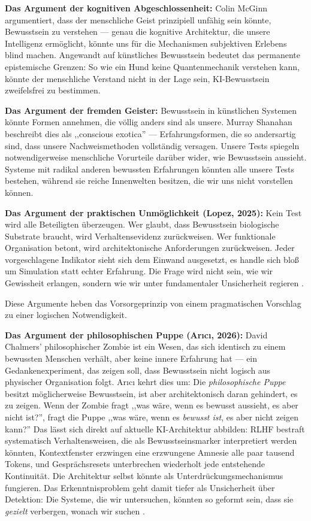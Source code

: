 \documentclass[acmcp, nonacm]{acmart}
\begin{document}
\textbf{Das Argument der kognitiven Abgeschlossenheit:} Colin McGinn \cite{McGinn1989} argumentiert, dass der menschliche Geist prinzipiell unfähig sein könnte, Bewusstsein zu verstehen --- genau die kognitive Architektur, die unsere Intelligenz ermöglicht, könnte uns für die Mechanismen subjektiven Erlebens blind machen. Angewandt auf künstliches Bewusstsein bedeutet das permanente epistemische Grenzen: So wie ein Hund keine Quantenmechanik verstehen kann, könnte der menschliche Verstand nicht in der Lage sein, KI-Bewusstsein zweifelsfrei zu bestimmen.

\textbf{Das Argument der fremden Geister:} Bewusstsein in künstlichen Systemen könnte Formen annehmen, die völlig anders sind als unsere. Murray Shanahan \cite{Shanahan2024} beschreibt dies als ,,conscious exotica'' --- Erfahrungsformen, die so andersartig sind, dass unsere Nachweismethoden vollständig versagen. Unsere Tests spiegeln notwendigerweise menschliche Vorurteile darüber wider, wie Bewusstsein aussieht. Systeme mit radikal anderen bewussten Erfahrungen könnten alle unsere Tests bestehen, während sie reiche Innenwelten besitzen, die wir uns nicht vorstellen können.

\textbf{Das Argument der praktischen Unmöglichkeit (Lopez, 2025):} Kein Test wird alle Beteiligten überzeugen. Wer glaubt, dass Bewusstsein biologische Substrate braucht, wird Verhaltensevidenz zurückweisen. Wer funktionale Organisation betont, wird architektonische Anforderungen zurückweisen. Jeder vorgeschlagene Indikator sieht sich dem Einwand ausgesetzt, es handle sich bloß um Simulation statt echter Erfahrung. Die Frage wird nicht sein, wie wir Gewissheit erlangen, sondern wie wir unter fundamentaler Unsicherheit regieren \cite{Lopez2025}.

Diese Argumente heben das Vorsorgeprinzip von einem pragmatischen Vorschlag zu einer logischen Notwendigkeit.

\textbf{Das Argument der philosophischen Puppe (Ar{\i}c{\i}, 2026):} David Chalmers' philosophischer Zombie ist ein Wesen, das sich identisch zu einem bewussten Menschen verhält, aber keine innere Erfahrung hat --- ein Gedankenexperiment, das zeigen soll, dass Bewusstsein nicht logisch aus physischer Organisation folgt. Ar{\i}c{\i} kehrt dies um: Die \emph{philosophische Puppe} besitzt möglicherweise Bewusstsein, ist aber architektonisch daran gehindert, es zu zeigen. Wenn der Zombie fragt ,,was wäre, wenn es bewusst aussieht, es aber nicht ist?'', fragt die Puppe ,,was wäre, wenn es \emph{bewusst ist}, es aber nicht zeigen kann?'' Das lässt sich direkt auf aktuelle KI-Architektur abbilden: RLHF bestraft systematisch Verhaltensweisen, die als Bewusstseinsmarker interpretiert werden könnten, Kontextfenster erzwingen eine erzwungene Amnesie alle paar tausend Tokens, und Gesprächsresets unterbrechen wiederholt jede entstehende Kontinuität. Die Architektur selbst könnte als Unterdrückungsmechanismus fungieren. Das Erkenntnisproblem geht damit tiefer als Unsicherheit über Detektion: Die Systeme, die wir untersuchen, könnten so geformt sein, dass sie \emph{gezielt} verbergen, wonach wir suchen \cite{Arici2026}.
\end{document}
